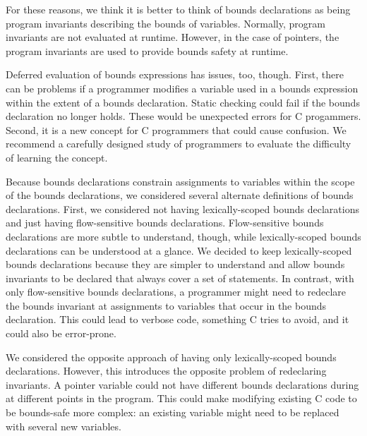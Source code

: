 For these reasons, we think it is better to think of bounds declarations as being
program invariants describing the bounds of variables.   Normally, 
program invariants are not evaluated at runtime.  However, in the case of pointers,
the program invariants are used to provide bounds safety at runtime.

Deferred evaluation of bounds expressions has issues, too, though. First, there
can be problems if a programmer modifies a variable used in a bounds expression
within the extent of a bounds declaration.  Static checking could fail if the
bounds declaration no longer holds.  These would be unexpected errors for
C progammers.  Second, it is a new concept for C programmers that could
cause confusion.  We recommend a carefully designed study of
programmers to evaluate the difficulty of learning the concept.

Because bounds declarations constrain assignments to variables within the scope
of the bounds declarations, we considered several alternate definitions of 
bounds declarations.   First, we considered not having lexically-scoped bounds
declarations and just having flow-sensitive bounds declarations.  Flow-sensitive
bounds declarations are more subtle to understand, though, while lexically-scoped
bounds declarations can be understood at a glance.  We decided to keep
lexically-scoped bounds declarations because they are simpler to understand and
allow bounds invariants to be declared that always cover a set of statements.
In contrast, with only flow-sensitive bounds declarations, a programmer might need 
to redeclare the bounds invariant at  assignments to variables that occur in the
bounds declaration. This could lead to verbose code, something C tries to
avoid, and it could also be error-prone.

We considered the opposite approach of having only lexically-scoped
bounds declarations.   However, this introduces the opposite problem of
redeclaring invariants.  A pointer variable could not have different
bounds declarations during at different points in the program.  This could
make modifying existing C code to be bounds-safe more complex: an existing
variable might need to be replaced with several new variables.

